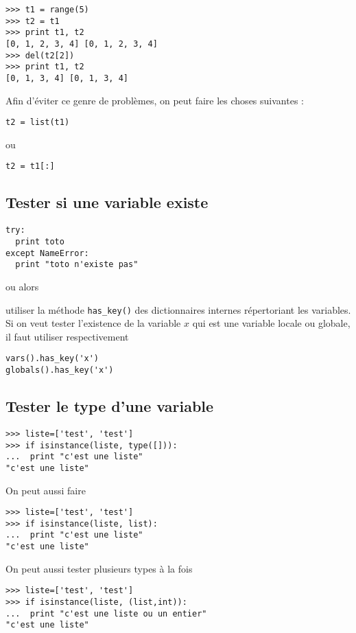 \documentclass[a4paper,twoside]{article}
\begin{document}
\begin{exemple}
\begin{verbatim}
>>> t1 = range(5)
>>> t2 = t1
>>> print t1, t2
[0, 1, 2, 3, 4] [0, 1, 2, 3, 4]
>>> del(t2[2])
>>> print t1, t2
[0, 1, 3, 4] [0, 1, 3, 4]
\end{verbatim}
\end{exemple}

Afin d'éviter ce genre de problèmes, on peut faire les choses suivantes :
\begin{verbatim}
t2 = list(t1)
\end{verbatim}
ou
\begin{verbatim}
t2 = t1[:]
\end{verbatim}


\subsection{Tester si une variable existe}
\begin{verbatim}
try:
  print toto
except NameError:
  print "toto n'existe pas"
\end{verbatim}

ou alors

utiliser la méthode \texttt{has\_key()} des dictionnaires internes répertoriant les variables. Si on veut tester l'existence de la variable $x$  qui est une variable locale ou globale, il faut utiliser respectivement
\begin{verbatim}
vars().has_key('x')
globals().has_key('x')
\end{verbatim}

\subsection{Tester le type d'une variable}
\begin{verbatim}
>>> liste=['test', 'test']
>>> if isinstance(liste, type([])):
...  print "c'est une liste"
"c'est une liste"
\end{verbatim}

On peut aussi faire
\begin{verbatim}
>>> liste=['test', 'test']
>>> if isinstance(liste, list):
...  print "c'est une liste"
"c'est une liste"
\end{verbatim}

On peut aussi tester plusieurs types à la fois
\begin{verbatim}
>>> liste=['test', 'test']
>>> if isinstance(liste, (list,int)):
...  print "c'est une liste ou un entier"
"c'est une liste"
\end{verbatim}
\end{document}
